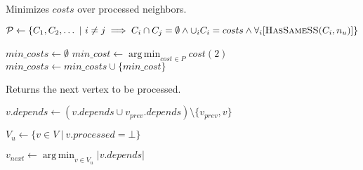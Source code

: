 \documentclass{article}
\newcommand{\set}[1]{\{#1\}}
\DeclareMathOperator*{\argmin}{arg\,min}
\begin{document}
\begin{algorithm}
	\caption{\label{alg:getmincosts}Minimizes $costs$ over processed neighbors.}

\begin{algorithmic}[1]

	\State $\mathcal{P} \leftarrow \set{C_1, C_2, \dots ~|~ i \not= j \implies
	C_i \cap C_j = \emptyset \land \cup_{i} C_i = costs \land
	\forall_i [\Call{HasSameSS}{C_i, n_u}]}$
	\Statex

	\State $min\_costs \leftarrow \emptyset$
		\State $min\_cost \leftarrow \argmin_{cost\in P} cost(2)$
		\State $min\_costs \leftarrow min\_costs \cup \set{min\_cost}$
	\EndFor
	\Statex

	\State {}

	\EndProcedure
\end{algorithmic}
\end{algorithm}


\begin{algorithm}
	\caption{\label{alg:getnextvertex}Returns the next vertex to be processed.}

\begin{algorithmic}[1]
			\State $v.depends \leftarrow (v.depends \cup v_{prev}.depends) \setminus
			\set{v_{prev}, v}$
		\EndFor
	\EndIf
	\Statex

	\State $V_u \leftarrow \set{v\in V ~|~ v.processed = \bot}$
		\State \Return{$\bot$}
	\EndIf
	\Statex 

	\State $v_{next} \leftarrow \argmin_{v\in V_u} |v.depends|$
	\State {}

	\EndProcedure
\end{algorithmic}
\end{algorithm}
\end{document}

